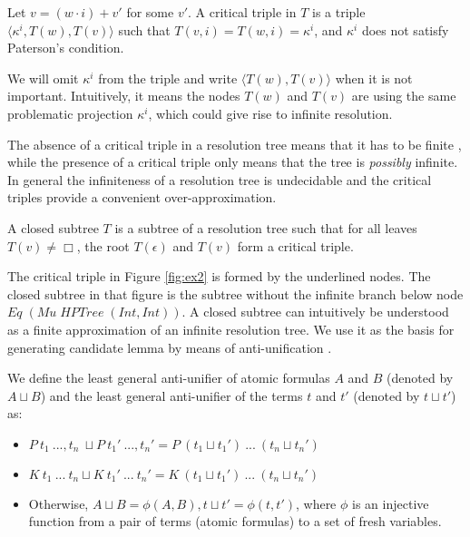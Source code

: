 \documentclass{llncs}
\newcommand{\Conid}[1]{\mathit{#1}}
\begin{document}
\begin{definition}
\label{loop}
Let $v = (w \cdot i) + v'$ for some $v'$. A critical triple in $T$ is a triple $\langle \kappa^i, T(w), T(v) \rangle$ such that $T(v, i) = T(w, i) = \kappa^i$, and $\kappa^i$ does not satisfy Paterson's condition. 
\end{definition}

We will omit $\kappa^i$ from the triple and write $\langle T(w), T(v)
\rangle$ when it is not important. Intuitively, it means the nodes $T(w)$ and $T(v)$ are
using the same problematic projection $\kappa^i$, which could give rise to infinite resolution. 

The absence of a critical triple in a resolution tree means
that it has to be finite \cite{SulzmannDJS07}, while the presence of
a critical triple only means that the tree is \textit{possibly} infinite. In
general the infiniteness of a resolution tree is undecidable and
the critical triples provide a convenient over-approximation.


\begin{definition}
  \label{closed}
  A closed subtree $T$ is a subtree of a resolution tree such that for all leaves $T(v) \not = \Box$,
the root $T(\epsilon)$ and $T(v)$ form a critical triple. 
\end{definition}

The critical triple in Figure \ref{fig:ex2} is formed by the underlined nodes. The
closed subtree in that figure is the subtree without the infinite branch below node
\ensuremath{\Conid{Eq}\;(\Conid{Mu}\;\Conid{HPTree}\;(\Conid{Int},\Conid{Int}))}. A closed subtree can intuitively be
understood as a finite approximation of an infinite resolution tree. We use it
as the basis for generating candidate lemma by means of 
anti-unification \cite{plotkin1970note}. 




\begin{definition}
We define the least general anti-unifier of atomic formulas $A$ and $B$ (denoted by $A \sqcup B$) and 
the least general anti-unifier of the terms $t$ and $t'$ (denoted by $t \sqcup t'$) as: 

  \begin{itemize}
  \item $P\ t_1\ ..., t_n\ \sqcup P\ t_1'\ ..., t_n' = P\ (t_1 \sqcup t_1')\ ...\ (t_n \sqcup t_n')$
  \item $K\ t_1\ ...\ t_n \sqcup K \ t_1'\ ...\ t_n' = K\ (t_1\sqcup t_1')\ ...\ (t_n\sqcup t_n')$
  \item Otherwise, $A \sqcup B = \phi(A,B), t \sqcup t' = \phi(t,t')$, where $\phi$ is an injective function from a pair of terms (atomic formulas) to a set of fresh variables. 
  \end{itemize}
\end{definition}
\end{document}
